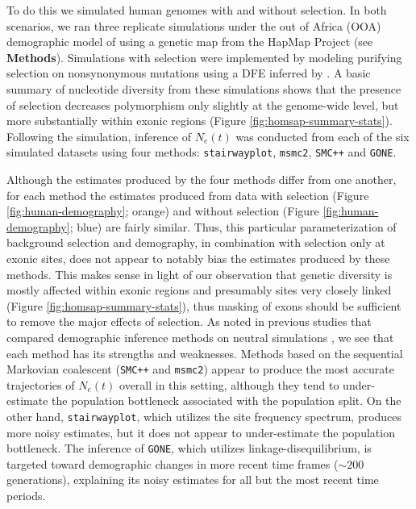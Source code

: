 \documentclass[hidelinks]{article}
\newcommand{\msmc}{\texttt{msmc2}\xspace}
\newcommand{\stairway}{\texttt{stairwayplot}\xspace}
\newcommand{\gone}{\texttt{GONE}\xspace}
\newcommand{\smcpp}{\texttt{SMC++}\xspace}
\begin{document}
    To do this we simulated human genomes with and without selection.
    In both scenarios, we ran three replicate simulations
    under the out of Africa (OOA) demographic model of
    \citet{ragsdale2019models} using a genetic map from the HapMap Project \citep{international2007second} (see \textbf{Methods}).
    Simulations with selection were implemented by modeling purifying selection on nonsynonymous mutations
    using a DFE inferred by \citet{kim2017inference}.
    A basic summary of nucleotide diversity from these simulations
    shows that the presence of selection decreases polymorphism only slightly
    at the genome-wide level, but more substantially within exonic regions (Figure \ref{fig:homsap-summary-stats}). 
    Following the simulation, inference of $N_e(t)$ was conducted from each of the six simulated datasets using four methods:
    \stairway \citep{liu2020stairway}, \msmc \citep{Schiffels2020}, \smcpp \citep{terhorst2017robust} and \gone \citep{santiago2020recent}.

    Although the estimates produced by the four methods differ from one another,
    for each method the estimates produced from data with selection (Figure
    \ref{fig:human-demography}; orange) and without selection (Figure
    \ref{fig:human-demography}; blue) are fairly similar.
    Thus, this particular parameterization of background selection and demography,
    in combination with selection only at exonic sites, %
    does not appear to notably bias the estimates produced by these methods.
    This makes sense in light of our observation that genetic diversity is mostly affected
    within exonic regions and presumably sites very closely linked (Figure \ref{fig:homsap-summary-stats}),
    thus masking of exons should be sufficient to remove the major effects of selection.
    As noted in previous studies that compared demographic inference methods
    on neutral simulations \citep{adrion2020community},
    we see that each method has its strengths and weaknesses.
    Methods based on the sequential Markovian coalescent (\smcpp and \msmc)
    appear to produce the most accurate trajectories of $N_e(t)$ overall
    in this setting, although they tend to under-estimate the population
    bottleneck associated with the population split.
    On the other hand, \stairway, which utilizes the site frequency spectrum,
    produces more noisy estimates,
    but it does not appear to under-estimate the population bottleneck.
    The inference of \gone, which utilizes linkage-disequilibrium,
    is targeted toward demographic changes in more recent time frames ($\sim 200$ generations),
    explaining its noisy estimates for all but the most recent time periods.
\end{document}
